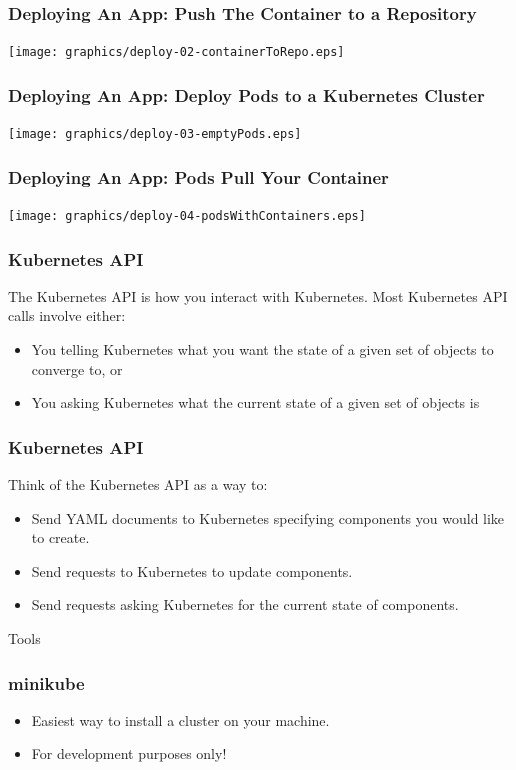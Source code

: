 \documentclass{beamer}
\begin{document}
\begin{frame}
    \frametitle{Deploying An App: Push The Container to a Repository}
    \texttt{[image: graphics/deploy-02-containerToRepo.eps]}
\end{frame}

\begin{frame}
    \frametitle{Deploying An App: Deploy Pods to a Kubernetes Cluster}
    \texttt{[image: graphics/deploy-03-emptyPods.eps]}
\end{frame}

\begin{frame}
    \frametitle{Deploying An App: Pods Pull Your Container}
    \texttt{[image: graphics/deploy-04-podsWithContainers.eps]}
\end{frame}

\begin{frame}
\frametitle{Kubernetes API}
The Kubernetes API is how you interact with Kubernetes. Most Kubernetes API calls involve either:
\begin{itemize}
    \item You telling Kubernetes what you want the state of a given set of objects to converge to, or
    \item You asking Kubernetes what the current state of a given set of objects is
\end{itemize}
\end{frame}

\begin{frame}
\frametitle{Kubernetes API}
Think of the Kubernetes API as a way to:
\begin{itemize}
    \item Send YAML documents to Kubernetes specifying components you would like to create.
    \item Send requests to Kubernetes to update components.
    \item Send requests asking Kubernetes for the current state of components.
\end{itemize}
\end{frame}

\begin{frame}
    \begin{center}
        \Huge Tools
    \end{center}
\end{frame}

\begin{frame}
    \frametitle{minikube\footnotemark}
    \begin{itemize}
        \item Easiest way to install a cluster on your machine.
        \item For development purposes only!
    \end{itemize}
\end{frame}
\end{document}
